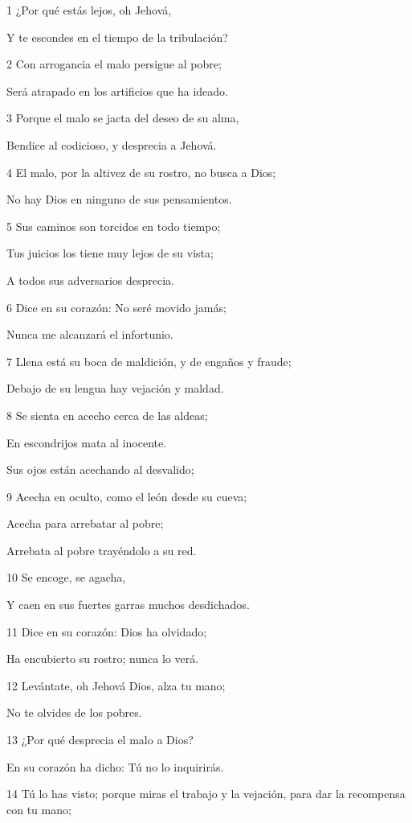 \par 1 ¿Por qué estás lejos, oh Jehová,
\par Y te escondes en el tiempo de la tribulación?
\par 2 Con arrogancia el malo persigue al pobre;
\par Será atrapado en los artificios que ha ideado.
\par 3 Porque el malo se jacta del deseo de su alma,
\par Bendice al codicioso, y desprecia a Jehová.
\par 4 El malo, por la altivez de su rostro, no busca a Dios;
\par No hay Dios en ninguno de sus pensamientos.
\par 5 Sus caminos son torcidos en todo tiempo;
\par Tus juicios los tiene muy lejos de su vista;
\par A todos sus adversarios desprecia.
\par 6 Dice en su corazón: No seré movido jamás;
\par Nunca me alcanzará el infortunio.
\par 7 Llena está su boca de maldición, y de engaños y fraude;
\par Debajo de su lengua hay vejación y maldad.
\par 8 Se sienta en acecho cerca de las aldeas;
\par En escondrijos mata al inocente.
\par Sus ojos están acechando al desvalido;
\par 9 Acecha en oculto, como el león desde su cueva;
\par Acecha para arrebatar al pobre;
\par Arrebata al pobre trayéndolo a su red.
\par 10 Se encoge, se agacha,
\par Y caen en sus fuertes garras muchos desdichados.
\par 11 Dice en su corazón: Dios ha olvidado;
\par Ha encubierto su rostro; nunca lo verá.
\par 12 Levántate, oh Jehová Dios, alza tu mano;
\par No te olvides de los pobres.
\par 13 ¿Por qué desprecia el malo a Dios?
\par En su corazón ha dicho: Tú no lo inquirirás.
\par 14 Tú lo has visto; porque miras el trabajo y la vejación, para dar la recompensa con tu mano;
